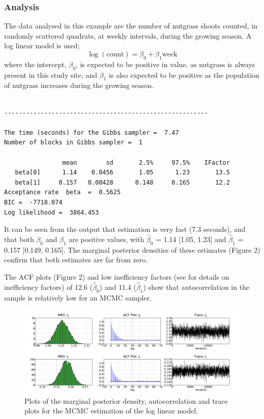 \documentclass[article]{jss}
\begin{document}
\subsubsection{Analysis}

The data analysed in this example are the number of nutgrass shoots
counted, in randomly scattered quadrats, at weekly intervals, during
the growing season. A log linear model is used; \begin{equation}
  \log(\mbox{count})=\beta_{0}+\beta_{1}\mbox{week}\end{equation}
where the intercept, $\beta_{0}$, is expected to be positive in value,
as nutgrass is always present in this study site, and $\beta_{1}$ is also expected to be
positive as the population of nutgrass increases during the growing
season.

\begin{verbatim}

--------------------------------------------------------

The time (seconds) for the Gibbs sampler =  7.47
Number of blocks in Gibbs sampler =  1

                mean        sd       2.5%     97.5%    IFactor
   beta[0]      1.14    0.0456       1.05      1.23       13.5
   beta[1]     0.157   0.00428      0.148     0.165       12.2
Acceptance rate  beta  =  0.5625
BIC =  -7718.074
Log likelihood =  3864.453

\end{verbatim}

It can be seen from the output that estimation is very fast (7.3
seconds), and that both $\beta_{0}$ and $\beta_{1}$ are positive
values, with $\hat{\beta}_{0}$ = 1.14 {[}1.05, 1.23{]} and
$\hat{\beta}_{1}$ = 0.157 {[}0.149, 0.165{]}. The marginal posterior
densities of these estimates (Figure 2) confirm that both estimates
are far from zero.

The ACF plots (Figure 2) and low inefficiency factors (see \citet{ChibGreenberg1996} for details on
inefficiency factors) of 12.6
($\hat{\beta}_{0}$) and 11.4 ($\hat{\beta}_{1}$) show that
autocorrelation in the sample is relatively low for an MCMC sampler. %
\begin{figure}
  \begin{center}
    \includegraphics[width=16cm]{ex_loglinear.pdf}
  \end{center}
\caption{Plots of the marginal posterior density, autocorrelation and trace
plots for the MCMC estimation of the log linear model.}

\end{figure}
\end{document}
